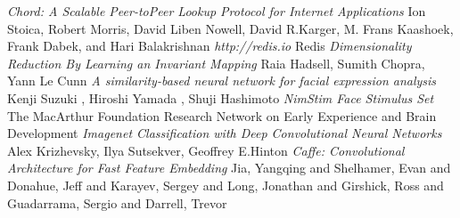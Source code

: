 \documentclass[10pt,twocolumn,letterpaper]{article}
\begin{document}
\begin{thebibliography}{9}
 \emph{Chord: A Scalable Peer-toPeer Lookup Protocol for Internet Applications}  Ion Stoica, Robert Morris, David Liben Nowell, David R.Karger, M. Frans Kaashoek, Frank Dabek, and Hari Balakrishnan
 \emph{http://redis.io}  Redis
 \emph{Dimensionality Reduction By Learning an Invariant Mapping} Raia Hadsell, Sumith Chopra, Yann Le Cunn
 \emph{A similarity-based neural network for facial expression analysis} Kenji Suzuki , Hiroshi Yamada , Shuji Hashimoto
 \emph{NimStim Face Stimulus Set} The MacArthur Foundation Research Network on Early Experience and Brain Development
 \emph{Imagenet Classification with Deep Convolutional Neural Networks} Alex Krizhevsky, Ilya Sutsekver, Geoffrey E.Hinton
 \emph{Caffe: Convolutional Architecture for Fast Feature Embedding} Jia, Yangqing and Shelhamer, Evan and Donahue, Jeff and Karayev, Sergey and Long, Jonathan and Girshick, Ross and Guadarrama, Sergio and Darrell, Trevor
\end{thebibliography}
{\small


} 
\end{document}

